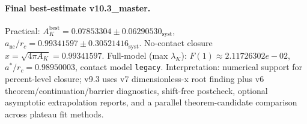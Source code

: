\paragraph{Final best-estimate v10.3_master.}
Practical: $A_K^{\mathrm{best}} = 0.07853304 \pm 0.06290530_{\mathrm{syst}}$, $a_{\mathrm{nc}}/r_c = 0.99341597 \pm 0.30521416_{\mathrm{syst}}$.
No-contact closure $x = \sqrt{4\pi A_K} = 0.99341597$.
Full-model (max $\lambda_K$): $F(1) \approx 2.11726302e-02$, $a^*/r_c = 0.98950003$, contact model \texttt{legacy}.
Interpretation: numerical support for percent-level closure; v9.3 uses v7 dimensionless-x root finding plus v6 theorem/continuation/barrier diagnostics, shift-free postcheck, optional asymptotic extrapolation reports, and a parallel theorem-candidate comparison across plateau fit methods.

